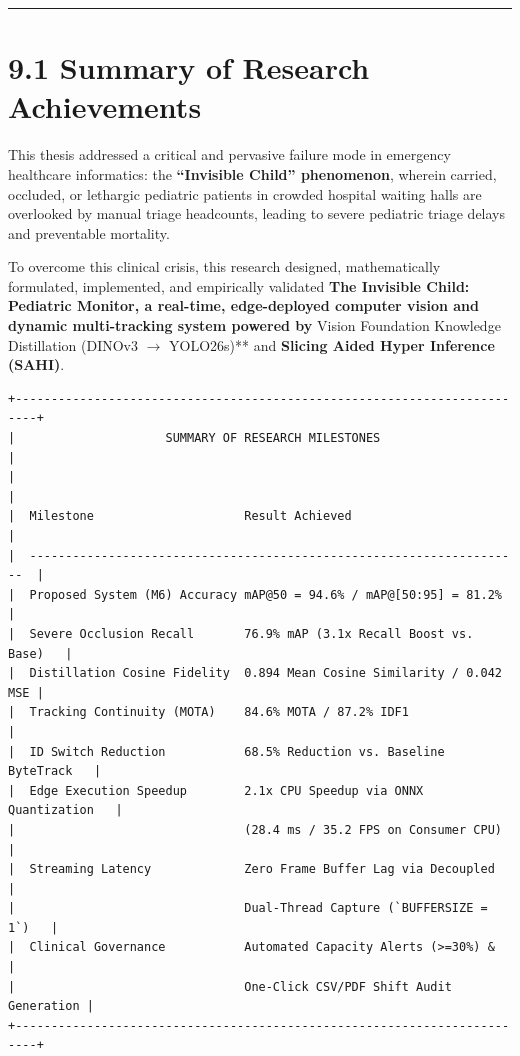 \begin{center}\rule{0.5\linewidth}{0.5pt}\end{center}

\section{9.1 Summary of Research
Achievements}\label{summary-of-research-achievements}

This thesis addressed a critical and pervasive failure mode in emergency
healthcare informatics: the \textbf{``Invisible Child'' phenomenon},
wherein carried, occluded, or lethargic pediatric patients in crowded
hospital waiting halls are overlooked by manual triage headcounts,
leading to severe pediatric triage delays and preventable mortality.

To overcome this clinical crisis, this research designed, mathematically
formulated, implemented, and empirically validated \textbf{The Invisible
Child: Pediatric Monitor, a real-time, edge-deployed computer vision and
dynamic multi-tracking system powered by }Vision Foundation Knowledge
Distillation (DINOv3 \(\to\) YOLO26s)** and \textbf{Slicing Aided Hyper
Inference (SAHI)}.

\begin{verbatim}
+-------------------------------------------------------------------------+
|                     SUMMARY OF RESEARCH MILESTONES                      |
|                                                                         |
|  Milestone                     Result Achieved                          |
|  ---------------------------------------------------------------------  |
|  Proposed System (M6) Accuracy mAP@50 = 94.6% / mAP@[50:95] = 81.2%     |
|  Severe Occlusion Recall       76.9% mAP (3.1x Recall Boost vs. Base)   |
|  Distillation Cosine Fidelity  0.894 Mean Cosine Similarity / 0.042 MSE |
|  Tracking Continuity (MOTA)    84.6% MOTA / 87.2% IDF1                  |
|  ID Switch Reduction           68.5% Reduction vs. Baseline ByteTrack   |
|  Edge Execution Speedup        2.1x CPU Speedup via ONNX Quantization   |
|                                (28.4 ms / 35.2 FPS on Consumer CPU)     |
|  Streaming Latency             Zero Frame Buffer Lag via Decoupled      |
|                                Dual-Thread Capture (`BUFFERSIZE = 1`)   |
|  Clinical Governance           Automated Capacity Alerts (>=30%) &      |
|                                One-Click CSV/PDF Shift Audit Generation |
+-------------------------------------------------------------------------+
\end{verbatim}


